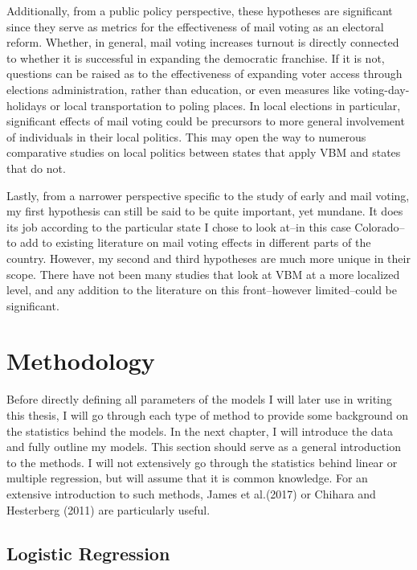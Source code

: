 \documentclass[12pt,twoside]{reedthesis}
\begin{document}
  Additionally, from a public policy perspective, these hypotheses are
  significant since they serve as metrics for the effectiveness of mail
  voting as an electoral reform. Whether, in general, mail voting
  increases turnout is directly connected to whether it is successful in
  expanding the democratic franchise. If it is not, questions can be
  raised as to the effectiveness of expanding voter access through
  elections administration, rather than education, or even measures like
  voting-day-holidays or local transportation to poling places. In local
  elections in particular, significant effects of mail voting could be
  precursors to more general involvement of individuals in their local
  politics. This may open the way to numerous comparative studies on local
  politics between states that apply VBM and states that do not.
  
  Lastly, from a narrower perspective specific to the study of early and
  mail voting, my first hypothesis can still be said to be quite
  important, yet mundane. It does its job according to the particular
  state I chose to look at--in this case Colorado--to add to existing
  literature on mail voting effects in different parts of the country.
  However, my second and third hypotheses are much more unique in their
  scope. There have not been many studies that look at VBM at a more
  localized level, and any addition to the literature on this
  front--however limited--could be significant.
  
  \section{Methodology}\label{methodology}
  
  Before directly defining all parameters of the models I will later use
  in writing this thesis, I will go through each type of method to provide
  some background on the statistics behind the models. In the next
  chapter, I will introduce the data and fully outline my models. This
  section should serve as a general introduction to the methods. I will
  not extensively go through the statistics behind linear or multiple
  regression, but will assume that it is common knowledge. For an
  extensive introduction to such methods, James et al.(2017) or Chihara
  and Hesterberg (2011) are particularly useful.
  
  \subsection{Logistic Regression}\label{logistic-regression}
  
\end{document}
